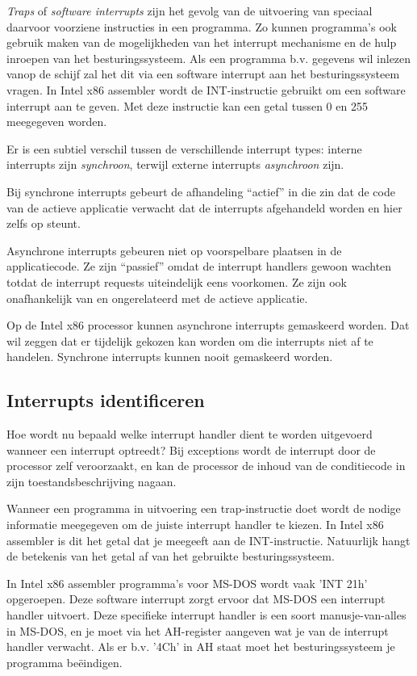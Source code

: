 \emph{Traps} of \emph{software interrupts} zijn het gevolg van de uitvoering van speciaal
daarvoor voorziene instructies in een programma. Zo kunnen programma's
ook gebruik maken van de mogelijkheden van het interrupt mechanisme en
de hulp inroepen van het besturingssysteem. Als een programma b.v.
gegevens wil inlezen vanop de schijf zal het dit via een software
interrupt aan het besturingssysteem vragen. In Intel x86 assembler wordt de INT-instructie gebruikt om een
software interrupt aan te geven. Met deze instructie kan een getal
tussen 0 en 255 meegegeven worden.

Er is een subtiel verschil tussen de verschillende interrupt types: interne interrupts zijn
\emph{synchroon}, terwijl externe interrupts \emph{asynchroon} zijn.

Bij synchrone interrupts gebeurt de afhandeling ``actief'' in die zin dat de code van de
actieve applicatie verwacht dat de interrupts afgehandeld worden en hier zelfs op steunt.

Asynchrone interrupts gebeuren niet op voorspelbare plaatsen in de applicatiecode. Ze zijn
``passief'' omdat de interrupt handlers gewoon wachten totdat de interrupt requests
uiteindelijk eens voorkomen. Ze zijn ook onafhankelijk van en ongerelateerd met de actieve applicatie.

Op de Intel x86 processor kunnen asynchrone interrupts gemaskeerd worden. Dat wil zeggen
dat er tijdelijk gekozen kan worden om die interrupts niet af te handelen. Synchrone
interrupts kunnen nooit gemaskeerd worden.

\subsection{Interrupts identificeren}

Hoe wordt nu bepaald welke interrupt handler dient te worden
uitgevoerd wanneer een interrupt optreedt? Bij exceptions wordt de
interrupt door de processor zelf veroorzaakt, en kan de processor de
inhoud van de conditiecode in zijn toestandsbeschrijving
nagaan.

Wanneer een programma in uitvoering een trap-instructie doet
wordt de nodige informatie meegegeven om de juiste interrupt handler
te kiezen. In Intel x86 assembler is dit het getal dat je meegeeft aan de
INT-instructie. Natuurlijk hangt de betekenis van het getal af van het
gebruikte besturingssysteem.

In Intel x86 assembler programma's voor MS-DOS wordt vaak 'INT 21h'
opgeroepen. Deze software interrupt zorgt ervoor dat MS-DOS een
interrupt handler uitvoert. Deze specifieke interrupt handler is een
soort manusje-van-alles in MS-DOS, en je moet via het AH-register
aangeven wat je van de interrupt handler verwacht. Als er b.v. '4Ch'
in AH staat moet het besturingssysteem je programma be\"eindigen.

